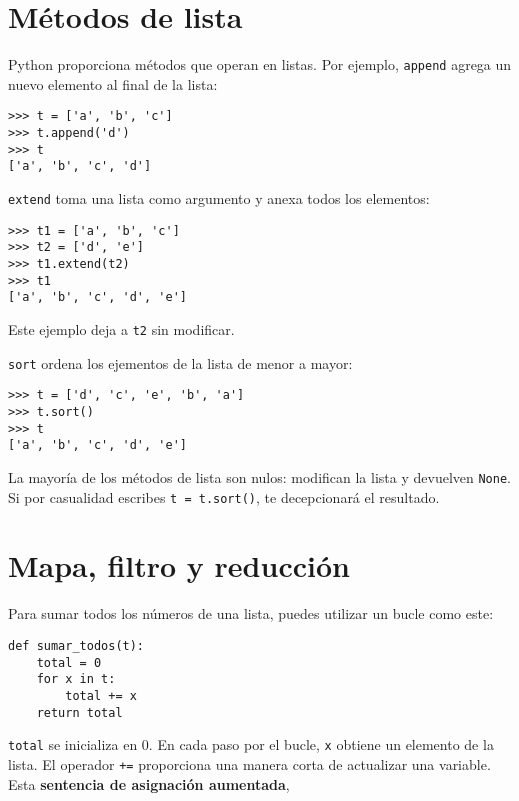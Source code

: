 \documentclass[10pt]{book}
\begin{document}
\section{Métodos de lista}

Python proporciona métodos que operan en listas.  Por ejemplo,
{\tt append} agrega un nuevo elemento al final de la lista:

\begin{verbatim}
>>> t = ['a', 'b', 'c']
>>> t.append('d')
>>> t
['a', 'b', 'c', 'd']
\end{verbatim}
%
{\tt extend} toma una lista como argumento y anexa todos
los elementos:

\begin{verbatim}
>>> t1 = ['a', 'b', 'c']
>>> t2 = ['d', 'e']
>>> t1.extend(t2)
>>> t1
['a', 'b', 'c', 'd', 'e']
\end{verbatim}
%
Este ejemplo deja a {\tt t2} sin modificar.

{\tt sort} ordena los ejementos de la lista de menor a mayor:

\begin{verbatim}
>>> t = ['d', 'c', 'e', 'b', 'a']
>>> t.sort()
>>> t
['a', 'b', 'c', 'd', 'e']
\end{verbatim}
%
La mayoría de los métodos de lista son nulos: modifican la lista y devuelven {\tt None}.
Si por casualidad escribes {\tt t = t.sort()}, te decepcionará
el resultado.


\section{Mapa, filtro y reducción}
\label{filter}

Para sumar todos los números de una lista, puedes utilizar un bucle como este:


\begin{verbatim}
def sumar_todos(t):
    total = 0
    for x in t:
        total += x
    return total
\end{verbatim}
%
{\tt total} se inicializa en 0.  En cada paso por el bucle,
{\tt x} obtiene un elemento de la lista.  El operador {\tt +=}
proporciona una manera corta de actualizar una variable.  Esta
{\bf sentencia de asignación aumentada},
\end{document}
